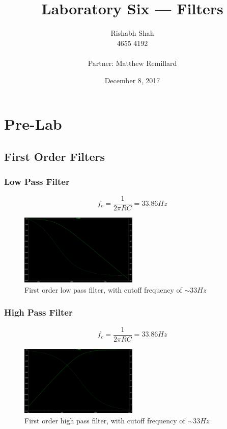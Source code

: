 \documentclass[10pt]{article}
\begin{document}
\title{Laboratory Six --- Filters}
\date{December 8, 2017}
\author{Rishabh Shah\\ 4655 4192\\ \\ Partner: Matthew Remillard}
\maketitle
\newpage

\section*{Pre-Lab}
\subsection*{First Order Filters}
\subsubsection*{Low Pass Filter}
$$f_c = \frac{1}{2\pi RC} = 33.86 Hz$$
\begin{figure}[H]
	\centering
	\includegraphics[width=0.5\textwidth]{PreLowPassFirst.png}
	\caption{First order low pass filter, with cutoff frequency of $\sim 33Hz$}
\end{figure}

\subsubsection*{High Pass Filter}
$$f_c = \frac{1}{2\pi RC} = 33.86 Hz$$
\begin{figure}[H]
	\centering
	\includegraphics[width=0.5\textwidth]{PreHighPassFirst.png}
	\caption{First order high pass filter, with cutoff frequency of $\sim 33Hz$}
\end{figure}
\end{document}
